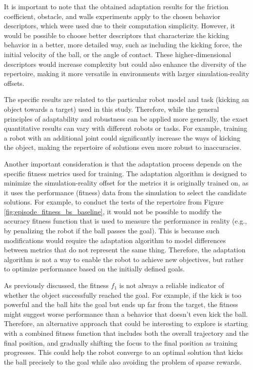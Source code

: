 \documentclass[12pt]{article}
\begin{document}
It is important to note that the obtained adaptation results for the friction coefficient, obstacle, and walls experiments apply to the chosen behavior descriptors, which were used due to their computation simplicity. However, it would be possible to choose better descriptors that characterize the kicking behavior in a better, more detailed way, such as including the kicking force, the initial velocity of the ball, or the angle of contact. These higher-dimensional descriptors would increase complexity but could also enhance the diversity of the repertoire, making it more versatile in environments with larger simulation-reality offsets. 

The specific results are related to the particular robot model and task (kicking an object towards a target) used in this study. Therefore, while the general principles of adaptability and robustness can be applied more generally, the exact quantitative results can vary with different robots or tasks. For example, training a robot with an additional joint could significantly increase the ways of kicking the object, making the repertoire of solutions even more robust to inaccuracies.

Another important consideration is that the adaptation process depends on the specific fitness metrics used for training. The adaptation algorithm is designed to minimize the simulation-reality offset for the metrics it is originally trained on, as it uses the performance (fitness) data from the simulation to select the candidate solutions.  For example, to conduct the tests of the repertoire from Figure \ref{fig:episode_fitness_bs_baseline}, it would not be possible to modify the accuracy fitness function that is used to measure the performance in reality (e.g., by penalizing the robot if the ball passes the goal). This is because such modifications would require the adaptation algorithm to model differences between metrics that do not represent the same thing. Therefore, the adaptation algorithm is not a way to enable the robot to achieve new objectives, but rather to optimize performance based on the initially defined goals.

As previously discussed, the fitness $f_1$ is not always a reliable indicator of whether the object successfully reached the goal. For example, if the kick is too powerful and the ball hits the goal but ends up far from the target, the fitness might suggest worse performance than a behavior that doesn’t even kick the ball. Therefore, an alternative approach that could be interesting to explore is starting with a combined fitness function that includes both the overall trajectory and the final position, and gradually shifting the focus to the final position as training progresses. This could help the robot converge to an optimal solution that kicks the ball precisely to the goal while also avoiding the problem of sparse rewards.
\end{document}
